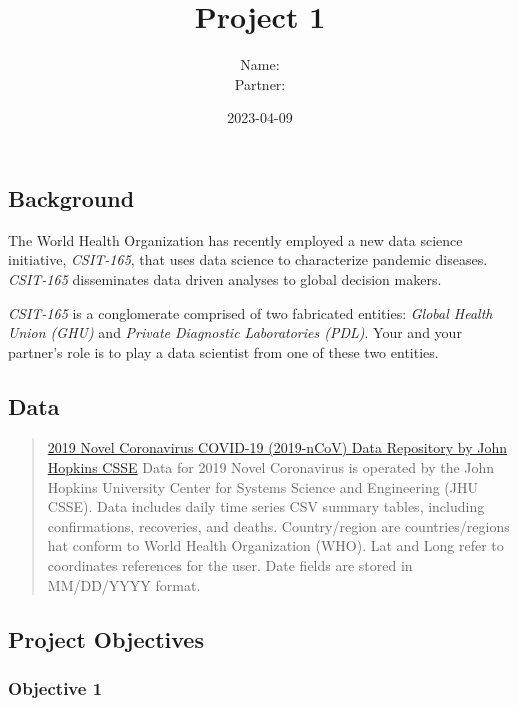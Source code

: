 \documentclass[
]{article}
\title{Project 1}
\author{Name:\\
Partner:}
\date{2023-04-09}
\begin{document}
\maketitle

{
\setcounter{tocdepth}{3}
\tableofcontents
}
\hypertarget{background}{%
\subsection{Background}\label{background}}

The World Health Organization has recently employed a new data science
initiative, \emph{CSIT-165}, that uses data science to characterize
pandemic diseases. \emph{CSIT-165} disseminates data driven analyses to
global decision makers.

\emph{CSIT-165} is a conglomerate comprised of two fabricated entities:
\emph{Global Health Union (GHU)} and \emph{Private Diagnostic
Laboratories (PDL)}. Your and your partner's role is to play a data
scientist from one of these two entities.

\hypertarget{data}{%
\subsection{Data}\label{data}}

\begin{quote}
\href{https://github.com/CSSEGISandData/COVID-19/tree/master/csse_covid_19_data/csse_covid_19_time_series}{2019
Novel Coronavirus COVID-19 (2019-nCoV) Data Repository by John Hopkins
CSSE} Data for 2019 Novel Coronavirus is operated by the John Hopkins
University Center for Systems Science and Engineering (JHU CSSE). Data
includes daily time series CSV summary tables, including confirmations,
recoveries, and deaths. Country/region are countries/regions hat conform
to World Health Organization (WHO). Lat and Long refer to coordinates
references for the user. Date fields are stored in MM/DD/YYYY format.
\end{quote}

\hypertarget{project-objectives}{%
\subsection{Project Objectives}\label{project-objectives}}

\hypertarget{objective-1}{%
\subsubsection{Objective 1}\label{objective-1}}
\end{document}
